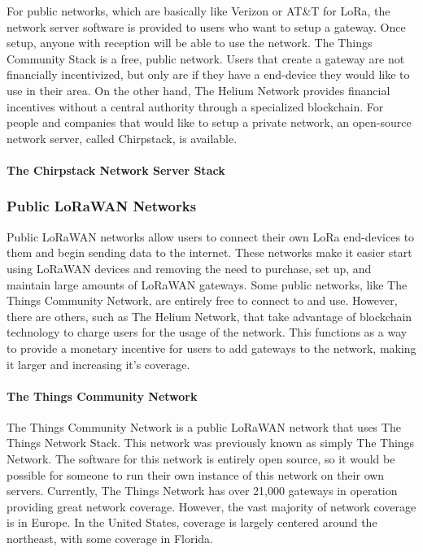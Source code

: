 For public networks, which are basically like Verizon or AT\&T for LoRa, the network server software
is provided to users who want to setup a gateway. Once setup, anyone with reception will be able to
use the network. The Things Community Stack is a free, public network. Users that create a gateway
are not financially incentivized, but only are if they have a end-device they would like to use in
their area. On the other hand, The Helium Network provides financial incentives without a central
authority through a specialized blockchain. For people and companies that would like to setup
a private network, an open-source network server, called Chirpstack, is available.


\paragraph{The Chirpstack Network Server Stack}

\subsubsection{Public LoRaWAN Networks} \label{public-networks}
Public LoRaWAN networks allow users to connect their own LoRa end-devices to them and begin sending data to the internet. These networks make it easier start using LoRaWAN devices and removing the need to purchase, set up, and maintain large amounts of LoRaWAN gateways. Some public networks, like The Things Community Network, are entirely free to connect to and use. However, there are others, such as The Helium Network, that take advantage of blockchain technology to charge users for the usage of the network. This functions as a way to provide a monetary incentive for users to add gateways to the network, making it larger and increasing it's coverage.

\paragraph{The Things Community Network}
The Things Community Network is a public LoRaWAN network that uses The Things Network Stack. This network was previously known as simply The Things Network. The software for this network is entirely open source, so it would be possible for someone to run their own instance of this network on their own servers. Currently, The Things Network has over 21,000 gateways in operation providing great network coverage. However, the vast majority of network coverage is in Europe. In the United States, coverage is largely centered around the northeast, with some coverage in Florida.

